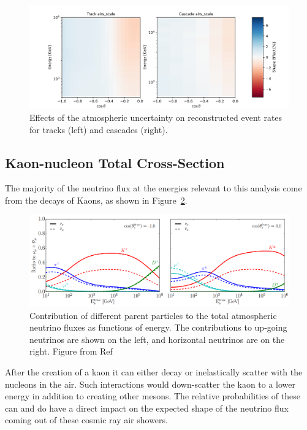 \documentclass[main.tex]{subfiles}
\begin{document}
\begin{figure}
    \centering
    \includegraphics[width=0.8\linewidth]{figures/systematics/airs_scale.png}
    \caption{Effects of the atmospheric uncertainty on reconstructed event rates for tracks (left) and cascades (right).}\label{fig:airs_reco}
\end{figure}




\subsection{Kaon-nucleon Total Cross-Section}\label{sec:kaon_loss}

The majority of the neutrino flux at the energies relevant to this analysis come from the decays of Kaons, as shown in Figure~\ref{fig:parentparty}.

\begin{figure}
    \centering
    \includegraphics[width=0.8\linewidth]{./figures/parent_party.png}
    \caption{Contribution of different parent particles to the total atmospheric neutrino fluxes as functions of energy. The contributions to up-going neutrinos are shown on the left, and horizontal neutrinos are on the right. Figure from Ref~\cite{Aartsen_2020_prd}}\label{fig:parentparty}
\end{figure}

After the creation of a kaon it can either decay or inelastically scatter with the nucleons in the air. 
Such interactions would down-scatter the kaon to a lower energy in addition to creating other mesons. 
The relative probabilities of these can and do have a direct impact on the expected shape of the neutrino flux coming out of these cosmic ray air showers. 
\end{document}

